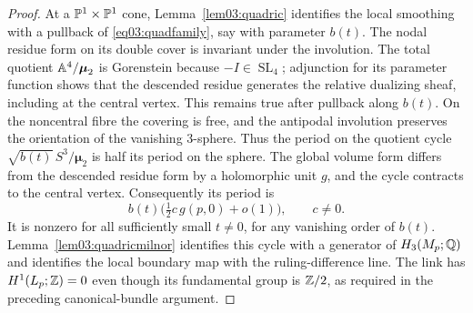 \begin{proof}
At a $\mathbb{P}^1\times\mathbb{P}^1$ cone, Lemma~\ref{lem03:quadric}
identifies the local smoothing with a pullback of
\eqref{eq03:quadfamily}, say with parameter $b(t)$.
The nodal residue form on its double cover is invariant under the
involution.  The total quotient $\mathbb{A}^4/\boldsymbol\mu_2$ is
Gorenstein because $-I\in\operatorname{SL}_4$; adjunction for its
parameter function shows that the descended residue generates the
relative dualizing sheaf, including at the central vertex.
This remains true after pullback along $b(t)$.
On the noncentral fibre the covering
is free, and the antipodal involution preserves the orientation of
the vanishing $3$-sphere.  Thus the period on the quotient cycle
$\sqrt{b(t)}\,S^3/\boldsymbol\mu_2$ is half its period on the
sphere.  The global volume form differs from the descended residue
form by a holomorphic unit $g$, and the cycle contracts to the
central vertex.  Consequently its period is
\[
 b(t)\bigl(\tfrac12 c\,g(p,0)+o(1)\bigr),\qquad c\ne0.
\]
It is nonzero for all sufficiently small $t\ne0$, for any
vanishing order of $b(t)$.  Lemma~\ref{lem03:quadricmilnor}
identifies this cycle with a generator of $H_3(M_p;\mathbb{Q})$ and
identifies the local boundary map with the ruling-difference line.
The link has $H^1(L_p;\mathbb{Z})=0$ even though its fundamental group
is $\mathbb{Z}/2$, as required in the preceding canonical-bundle argument.


\end{proof}
